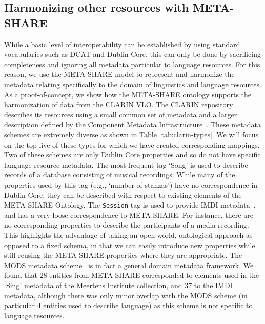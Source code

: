 \documentclass{llncs}
\begin{document}
\subsection{Harmonizing other resources with META-SHARE}
\label{sec:harmonization}
While a basic level of interoperability can be established by using standard
vocabularies such as DCAT and Dublin Core, this can only be done by sacrificing
completeness and ignoring all metadata particular to language resources. For
this reason, we use the META-SHARE model to represent and harmonize the metadata
relating specifically to the domain of linguistics and language resources. As a
proof-of-concept, we show how the META-SHARE ontology supports the harmonization
of data from the CLARIN VLO. The
CLARIN repository describes its resources using a small common set of metadata
and a larger description defined by the Component Metadata
Infrastructure~\cite[CMDI]{broeder2012cmdi}. These metadata schemes are
extremely diverse as shown in Table \ref{tab:clarin-types}.
We will focus on the
top five of these types for which we have created corresponding mappings. Two of these schemes are only Dublin Core properties and so do not have
specific language resource metadata. The most frequent tag `Song' is used to describe records of a 
database consisting of musical recordings. While many of the properties used by this tag (e.g., `number of
stanzas') have no correspondence in Dublin Core, they can be described with respect to existing elements of the META-SHARE Ontology.
The {\tt Session} tag is used to provide IMDI metadata~\cite{broeder2001imdi}, and has a very loose correspondence to META-SHARE. For instance, there are no corresponding properties to describe the participants of a media recording.
This highlights the advantage of
taking an open world, ontological approach as opposed to a fixed schema, in that
we can easily introduce new properties while still reusing the META-SHARE properties
where they are appropriate.
The MODS metadata
scheme~\cite{gartner2003mods} is in fact a general domain metadata framework.
We found that 28 entities from META-SHARE
corresponded to elements used in the `Sing' metadata of the Meertens Institute collection, and 37 to the IMDI metadata,
although there was only minor overlap with the MODS scheme (in particular 4
entities used to describe language) as this scheme is not specific to language
resources.
\end{document}
